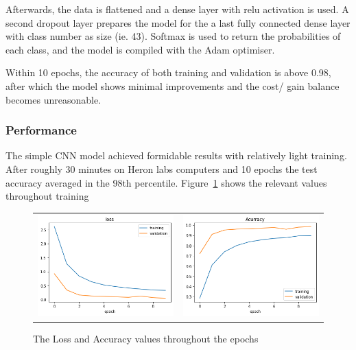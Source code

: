 \documentclass[12pt, landscape, margin=2cm]{article}
\begin{document}
\begin{multicols}{3}
Afterwards, the data is flattened and a dense layer with relu activation is
used. A second dropout layer prepares the model for the a last fully connected
dense layer with class number as size (ie. 43). Softmax is used to return the
probabilities of each class, and the model is compiled with the Adam optimiser.

Within 10 epochs, the accuracy of both training and validation is above 0.98,
after which the model shows minimal improvements and the cost/ gain balance
becomes unreasonable.

\subsubsection{Performance}
The simple CNN model achieved formidable results with relatively light training.
After roughly 30 minutes on Heron labs computers and 10 epochs the test accuracy
averaged in the 98th percentile. Figure~\ref{fig:acc} shows the relevant values
throughout training
\begin{figure}[H]
    \centering
    \begin{tabular}{cc}
    \includegraphics[scale=0.45]{accuracy1.png}&
    \includegraphics[scale=0.45]{accuracy2.png}\\
    \end{tabular}
    \caption{The Loss and Accuracy values throughout the epochs}
    \label{fig:acc}
\end{figure}


\end{multicols}
\end{document}
